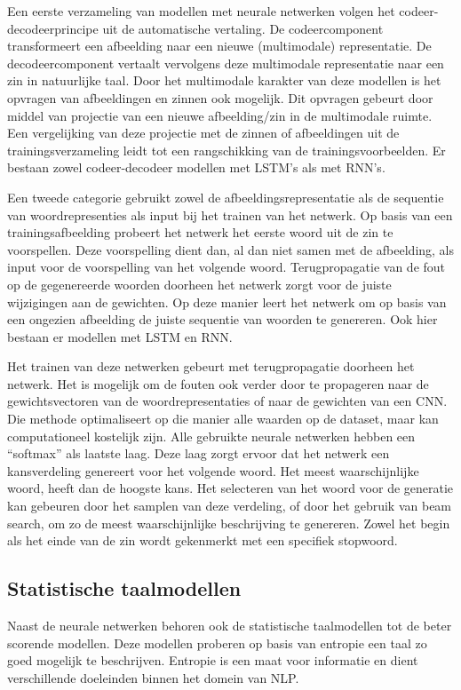 Een eerste verzameling van modellen met neurale netwerken volgen het codeer-decodeerprincipe uit de automatische vertaling.\cite{Kiros2014} De codeercomponent transformeert een afbeelding naar een nieuwe (multimodale) representatie. De decodeercomponent vertaalt vervolgens deze multimodale representatie naar een zin in natuurlijke taal. Door het multimodale karakter van deze modellen is het opvragen van afbeeldingen en zinnen ook mogelijk. Dit opvragen gebeurt door middel van projectie van een nieuwe afbeelding/zin in de multimodale ruimte. Een vergelijking van deze projectie met de zinnen of afbeeldingen uit de trainingsverzameling leidt tot een rangschikking van de trainingsvoorbeelden. Er bestaan zowel codeer-decodeer modellen met LSTM's\cite{Kiros2014} als met RNN's\cite{Karpathy2014,Mao2014a}.

Een tweede categorie gebruikt zowel de afbeeldingsrepresentatie als de sequentie van 
woordrepresenties als input bij het trainen van het netwerk. Op basis van een trainingsafbeelding probeert het netwerk het eerste woord uit de zin te voorspellen. Deze voorspelling dient dan, al dan niet samen met de afbeelding, als input voor de voorspelling van het volgende woord. Terugpropagatie van de fout op de gegenereerde woorden doorheen het netwerk zorgt voor de juiste wijzigingen aan de gewichten. Op deze manier leert het netwerk om op basis van een ongezien afbeelding de juiste sequentie van woorden te genereren. Ook hier bestaan er modellen met LSTM\cite{Donahue2015,Google} en RNN\cite{Karpathy2015}. 

Het trainen van deze netwerken gebeurt met terugpropagatie doorheen het netwerk. Het is mogelijk om de fouten ook verder door te propageren naar de gewichtsvectoren van de woordrepresentaties of naar de gewichten van een CNN. Die methode optimaliseert op die manier alle waarden op de  dataset, maar kan computationeel kostelijk zijn.
Alle gebruikte neurale netwerken hebben een ``softmax'' als laatste laag. Deze laag zorgt ervoor dat het netwerk een kansverdeling genereert voor het volgende woord. Het meest waarschijnlijke woord, heeft dan de hoogste kans.
Het selecteren van het woord voor de generatie kan gebeuren door het samplen van deze verdeling, of door het gebruik van beam search, om zo de meest waarschijnlijke beschrijving te genereren.  Zowel het begin als het einde van de zin wordt gekenmerkt met een specifiek stopwoord.

\subsection{Statistische taalmodellen}
Naast de neurale netwerken behoren ook de statistische taalmodellen tot de beter scorende modellen. Deze modellen proberen op basis van entropie een taal zo goed mogelijk te beschrijven. Entropie is een maat voor informatie en dient verschillende doeleinden binnen het domein van NLP. 

